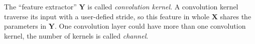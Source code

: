 The ``feature extractor'' $\mathbf{Y}$ is called \textit{convolution kernel}.
A convolution kernel traverse its input with a user-defied stride, so this feature in whole $\mathbf{X}$
shares the parameters in $\mathbf{Y}$.
One convolution layer could have more than one convolution kernel, the number of kernels is called \textit{channel}.

